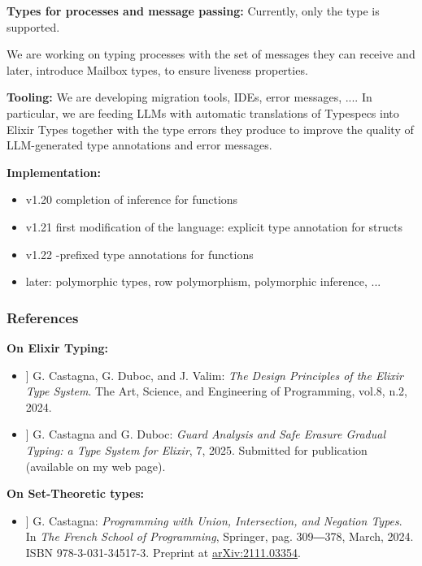 \begin{frame}
\bigskip
\textbf{\color{darkslateblue}Types for processes and message passing:}
Currently, only the type  is supported.

We are working on typing processes with the set of messages they can receive and later, introduce Mailbox types, to ensure liveness properties.


\bigskip
\textbf{\color{darkslateblue}Tooling:} We are developing migration tools, IDEs, error messages, .... In particular, we are  feeding LLMs with automatic translations of Typespecs into Elixir Types together with the type errors they produce to improve the quality of LLM-generated type annotations and error messages.


\bigskip
\textbf{\color{darkslateblue}Implementation:}
\begin{itemize}\setlength{\itemsep}{-2pt}
\item v1.20 completion of inference for functions
\item v1.21 first modification of the language: explicit type annotation for structs
\item v1.22 \code{!\color{darkgreen}\$!}-prefixed  type annotations for functions
\item later: polymorphic types, row polymorphism, polymorphic inference, ...
\end{itemize}
\end{frame}



\begin{frame}[fragile]
\frametitle{References}


\textbf{\color{darkslateblue}On Elixir Typing:}
\begin{itemize}\setlength{\itemsep}{2pt}
    \item[[\,1\!\!]] G. Castagna, G. Duboc, and J. Valim: \textit{The Design Principles of the Elixir Type System}. The Art, Science, and Engineering of Programming, vol.8, n.2, 2024.
    \item[[\,2\!\!]] G. Castagna and G. Duboc: \textit{Guard Analysis and Safe Erasure Gradual Typing: a Type System for Elixir}, 7, 2025. Submitted for publication (available on my web page).
\end{itemize}


\textbf{\color{darkslateblue}On Set-Theoretic types:}
\begin{itemize}\setlength{\itemsep}{2pt}
    \item[[\,3\!\!]] G. Castagna: \textit{Programming with Union, Intersection, and Negation Types}. In \textit{The French School of Programming}, Springer, pag. 309―378, March, 2024. ISBN 978-3-031-34517-3. Preprint at \href{https://arxiv.org/abs/2111.03354}{arXiv:2111.03354}.
\end{itemize}
\end{frame}